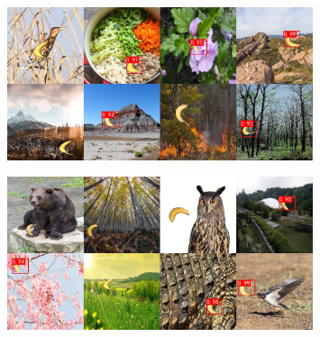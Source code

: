 \documentclass[UTF8]{ctexart}
\begin{document}
\begin{center}
\begin{minipage}{\textwidth}
\begin{figure}[H]
    \centering
    \includegraphics[width=0.8\textwidth]{picture/combined_predictions_3.jpg}
\end{figure}
\vfill

\begin{figure}[H]
    \centering
    \includegraphics[width=0.8\textwidth]{picture/combined_predictions_4.jpg}
\end{figure}
\end{minipage}
\end{center}

\vspace*{\fill} %
\end{document}
